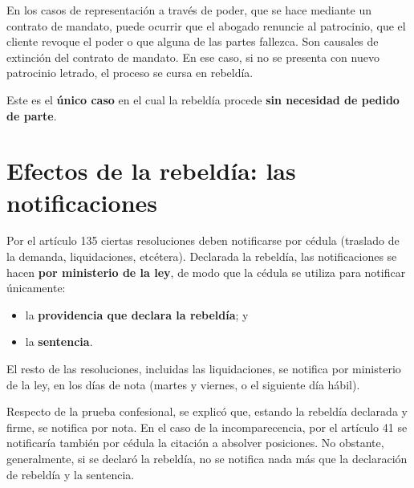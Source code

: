 \documentclass[12pt,oneside]{book}
\begin{document}
En los casos de representaci\'on a trav\'es de poder, que se hace mediante un contrato de mandato, puede ocurrir que el abogado renuncie al patrocinio, que el cliente revoque el poder o que alguna de las partes fallezca. Son causales de extinci\'on del contrato de mandato. En ese caso, si no se presenta con nuevo patrocinio letrado, el proceso se cursa en rebeld\'ia.

\begin{important}
Este es el \textbf{\'unico caso} en el cual la rebeld\'ia procede \textbf{sin necesidad de pedido de parte}.
\end{important}

\section{Efectos de la rebeld\'ia: las notificaciones}

Por el art\'iculo 135 ciertas resoluciones deben notificarse por c\'edula (traslado de la demanda, liquidaciones, etc\'etera). Declarada la rebeld\'ia, las notificaciones se hacen \textbf{por ministerio de la ley}, de modo que la c\'edula se utiliza para notificar \'unicamente:

\begin{itemize}
    \item la \textbf{providencia que declara la rebeld\'ia}; y
    \item la \textbf{sentencia}.
\end{itemize}

El resto de las resoluciones, incluidas las liquidaciones, se notifica por ministerio de la ley, en los d\'ias de nota (martes y viernes, o el siguiente d\'ia h\'abil).

Respecto de la prueba confesional, se explic\'o que, estando la rebeld\'ia declarada y firme, se notifica por nota. En el caso de la incomparecencia, por el art\'iculo 41 se notificar\'ia tambi\'en por c\'edula la citaci\'on a absolver posiciones. No obstante, generalmente, si se declar\'o la rebeld\'ia, no se notifica nada m\'as que la declaraci\'on de rebeld\'ia y la sentencia.

\end{document}

